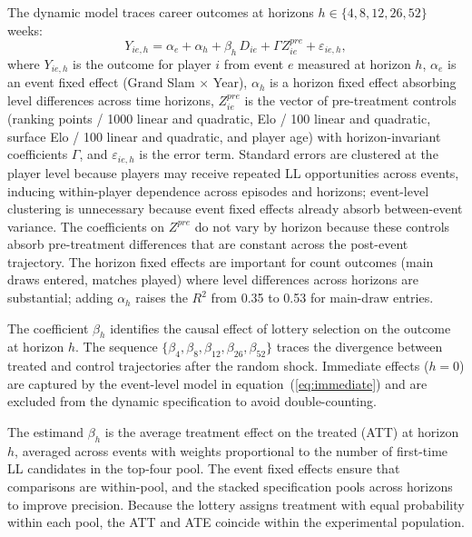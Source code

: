 The dynamic model traces career outcomes at horizons $h \in \{4, 8, 12, 26, 52\}$ weeks:
\begin{equation}
\label{eq:dynamics}
Y_{ie,h} = \alpha_e + \alpha_h + \beta_h \, D_{ie} + \Gamma Z^{pre}_{ie} + \varepsilon_{ie,h},
\end{equation}
where $Y_{ie,h}$ is the outcome for player $i$ from event $e$ measured at horizon $h$, $\alpha_e$ is an event fixed effect (Grand Slam $\times$ Year), $\alpha_h$ is a horizon fixed effect absorbing level differences across time horizons, $Z^{pre}_{ie}$ is the vector of pre-treatment controls (ranking points / 1000 linear and quadratic, Elo / 100 linear and quadratic, surface Elo / 100 linear and quadratic, and player age) with horizon-invariant coefficients $\Gamma$, and $\varepsilon_{ie,h}$ is the error term. Standard errors are clustered at the player level because players may receive repeated LL opportunities across events, inducing within-player dependence across episodes and horizons; event-level clustering is unnecessary because event fixed effects already absorb between-event variance. The coefficients on $Z^{pre}$ do not vary by horizon because these controls absorb pre-treatment differences that are constant across the post-event trajectory. The horizon fixed effects are important for count outcomes (main draws entered, matches played) where level differences across horizons are substantial; adding $\alpha_h$ raises the $R^2$ from 0.35 to 0.53 for main-draw entries.

The coefficient $\beta_h$ identifies the causal effect of lottery selection on the outcome at horizon $h$. The sequence $\{\beta_4, \beta_8, \beta_{12}, \beta_{26}, \beta_{52}\}$ traces the divergence between treated and control trajectories after the random shock. Immediate effects ($h = 0$) are captured by the event-level model in equation~(\ref{eq:immediate}) and are excluded from the dynamic specification to avoid double-counting.

The estimand $\beta_h$ is the average treatment effect on the treated (ATT) at horizon $h$, averaged across events with weights proportional to the number of first-time LL candidates in the top-four pool. The event fixed effects ensure that comparisons are within-pool, and the stacked specification pools across horizons to improve precision. Because the lottery assigns treatment with equal probability within each pool, the ATT and ATE coincide within the experimental population.

